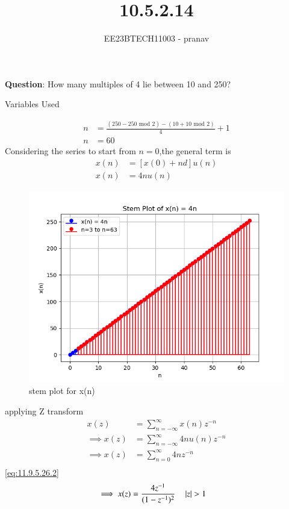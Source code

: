 \documentclass[journal,12pt,twocolumn]{IEEEtran}
\theoremstyle{remark}
\begin{document}

\vspace{3cm}

\title{10.5.2.14}
\author{EE23BTECH11003 - pranav}
\maketitle
\newpage

\bigskip
\renewcommand{\thefigure}{\arabic{figure}}
\renewcommand{\thetable}{\arabic{table}}

\textbf{Question}:
How many multiples of 4 lie between 10 and 250?\\
\solution
\begin{table}[h]
    \centering
    
    \caption{Variables Used}
    \label{tab:table_11.9.3.6}
\end{table}
\begin{align}
    n&=\frac{(250-250 \text{ mod } 2)-(10+10\text{ mod } 2)}{4}+1\\
    n&=60
\end{align}
Considering the series to start from $n=0$,the general term is
\begin{align}
x(n)&=[x(0)+nd]u(n)\\
x(n)&=4nu(n)
\end{align}
\begin{figure}[h!]
    \centering
    \includegraphics[width=1.1\linewidth]{figs/graph1.png}
    \caption{stem plot for x(n)}
\end{figure}
applying Z transform
\begin{align}
    x(z)&= \sum_{n=-\infty}^{\infty}x(n) z^{-n}\\
   \implies x(z)&= \sum_{n=-\infty}^{\infty} 4n u(n) z^{-n}\\
   \implies x(z) &=\sum_{n= 0}^{\infty} 4n  z^{-n}\\
   \end{align}
    \ref{eq:11.9.5.26.2}\\
   \begin{align}
   \implies x(z)&=\frac{4 z^{-1}}{(1-z^{-1})^{2}}\quad \left\vert z\right\vert>1
\end{align}
\end{document}

